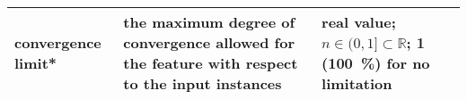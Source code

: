 \begin{landscape}
\begin{table}[tb]
\begin{tabulary}{\linewidth}{lLL}
			{\color{red}\textbf{convergence limit}}*
			& the maximum degree of convergence allowed for the feature with respect to the input instances
			& real value; $n \in (0, 1] \subset \mathbb{R}$; 1 (\SI{100}{\percent}) for no limitation \\
			\bottomrule
		\end{tabulary}
	\end{table}
\end{landscape}